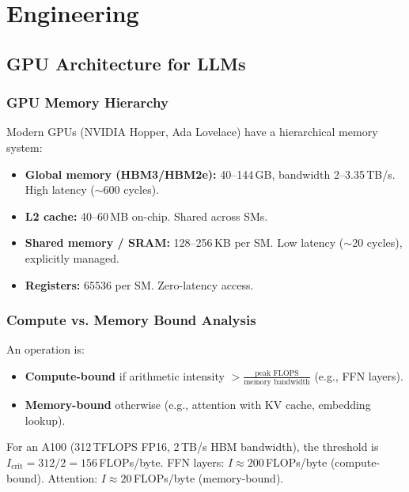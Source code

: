 \documentclass[11pt,a4paper]{book}
\theoremstyle{definition}
\begin{document}
\part{Engineering}

\chapter{GPU Architecture for LLMs}
\label{ch:gpu}

\section{GPU Memory Hierarchy}

Modern GPUs (NVIDIA Hopper, Ada Lovelace) have a hierarchical memory system:

\begin{itemize}
	\item \textbf{Global memory (HBM3/HBM2e):} 40--144\,GB, bandwidth 2--3.35\,TB/s. High latency ($\sim$600 cycles).
	\item \textbf{L2 cache:} 40--60\,MB on-chip. Shared across SMs.
	\item \textbf{Shared memory / SRAM:} 128--256\,KB per SM. Low latency ($\sim$20 cycles), explicitly managed.
	\item \textbf{Registers:} 65536 per SM. Zero-latency access.
\end{itemize}

\section{Compute vs. Memory Bound Analysis}

An operation is:
\begin{itemize}
	\item \textbf{Compute-bound} if arithmetic intensity $> \frac{\text{peak FLOPS}}{\text{memory bandwidth}}$ (e.g., FFN layers).
	\item \textbf{Memory-bound} otherwise (e.g., attention with KV cache, embedding lookup).
\end{itemize}

For an A100 (312\,TFLOPS FP16, 2\,TB/s HBM bandwidth), the threshold is $I_{\text{crit}} = 312 / 2 = 156$\,FLOPs/byte. FFN layers: $I \approx 200$\,FLOPs/byte (compute-bound). Attention: $I \approx 20$\,FLOPs/byte (memory-bound).
\end{document}
